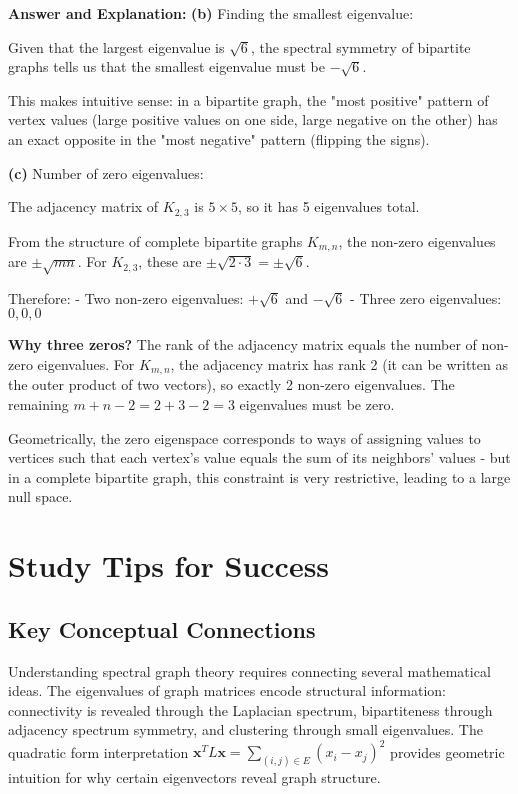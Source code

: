\documentclass[11pt]{article}
\newenvironment{answer}{\color{answercolor}\begin{framed}\textbf{Answer and Explanation:}}{\end{framed}}
\begin{document}
\begin{answer}
\textbf{(b)} Finding the smallest eigenvalue:

Given that the largest eigenvalue is $\sqrt{6}$, the spectral symmetry of bipartite graphs tells us that the smallest eigenvalue must be $-\sqrt{6}$.

This makes intuitive sense: in a bipartite graph, the "most positive" pattern of vertex values (large positive values on one side, large negative on the other) has an exact opposite in the "most negative" pattern (flipping the signs).

\textbf{(c)} Number of zero eigenvalues:

The adjacency matrix of $K_{2,3}$ is $5 \times 5$, so it has 5 eigenvalues total.

From the structure of complete bipartite graphs $K_{m,n}$, the non-zero eigenvalues are $\pm\sqrt{mn}$. For $K_{2,3}$, these are $\pm\sqrt{2 \cdot 3} = \pm\sqrt{6}$.

Therefore:
- Two non-zero eigenvalues: $+\sqrt{6}$ and $-\sqrt{6}$  
- Three zero eigenvalues: $0, 0, 0$

\textbf{Why three zeros?}
The rank of the adjacency matrix equals the number of non-zero eigenvalues. For $K_{m,n}$, the adjacency matrix has rank 2 (it can be written as the outer product of two vectors), so exactly 2 non-zero eigenvalues. The remaining $m + n - 2 = 2 + 3 - 2 = 3$ eigenvalues must be zero.

Geometrically, the zero eigenspace corresponds to ways of assigning values to vertices such that each vertex's value equals the sum of its neighbors' values - but in a complete bipartite graph, this constraint is very restrictive, leading to a large null space.
\end{answer}

\section*{Study Tips for Success}

\subsection*{Key Conceptual Connections}
Understanding spectral graph theory requires connecting several mathematical ideas. The eigenvalues of graph matrices encode structural information: connectivity is revealed through the Laplacian spectrum, bipartiteness through adjacency spectrum symmetry, and clustering through small eigenvalues. The quadratic form interpretation $\mathbf{x}^T L \mathbf{x} = \sum_{(i,j) \in E} (x_i - x_j)^2$ provides geometric intuition for why certain eigenvectors reveal graph structure.
\end{document}
